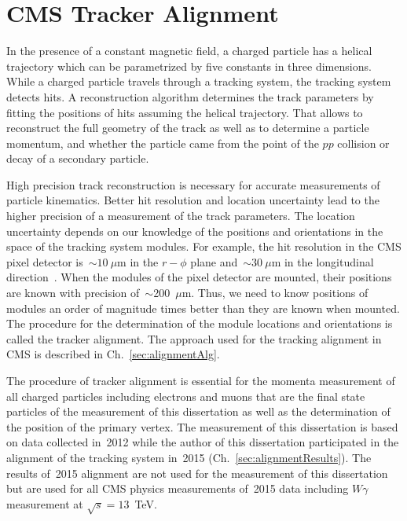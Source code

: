 \chapter{CMS Tracker Alignment} %
\label{sec:alignment}

In the presence of a constant magnetic field, a charged particle has a helical trajectory which can be parametrized by five constants in three dimensions. While a charged particle travels through a tracking system, the tracking system detects hits. A reconstruction algorithm determines the track parameters by fitting the positions of hits assuming the helical trajectory. That allows to reconstruct the full geometry of the track as well as to determine a particle momentum, and whether the particle came from the point of the $pp$ collision or decay of a secondary particle.

High precision track reconstruction is necessary for accurate measurements of particle kinematics. Better hit resolution and location uncertainty lead to the higher precision of a measurement of the track parameters. The location uncertainty depends on our knowledge of the positions and orientations in the space of the tracking system modules. For example, the hit resolution in the CMS pixel detector is~$\sim10~\mu$m in the $r-\phi$ plane and~$\sim30~\mu$m in the longitudinal direction~\cite{ref_trackerPerformance}. When the modules of the pixel detector are mounted, their positions are known with precision of~$\sim$200~$\mu$m. Thus, we need to know positions of modules an order of magnitude times better than they are known when mounted. The procedure for the determination of the module locations and orientations is called the tracker alignment. The approach used for the tracking alignment in CMS is described in Ch.~\ref{sec:alignmentAlg}.

The procedure of tracker alignment is essential for the momenta measurement of all charged particles including electrons and muons that are the final state particles of the measurement of this dissertation as well as the determination of the position of the primary vertex. The measurement of this dissertation is based on data collected in~2012 while the author of this dissertation participated in the alignment of the tracking system in~2015 (Ch.~\ref{sec:alignmentResults}). The results of~2015 alignment are not used for the measurement of this dissertation but are used for all CMS physics measurements of~2015 data including $W\gamma$ measurement at $\sqrt{s}=13$~TeV. 

